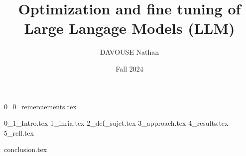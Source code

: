 \documentclass{rUTT}
\date{Fall 2024}
\author{{\sc DAVOUSE} Nathan}
\title{Optimization and fine tuning of Large Langage Models (LLM)}
\begin{document}
    \frontpageSTB %

    {
        \myILB
    }
    
    \pagestyle{UTT} 
    \justifying 


    {0_0_remerciements.tex} %

    \clearpage

    {
        \setcounter{tocdepth}{1}
        \renewcommand{\contentsname}{Summary}
        \tableofcontents
    }
    
    \clearpage
    
    {
    }
    \clearpage
    
    {
        
        \printglossary
        \printacronyms
    }
    \clearpage

    
    

    {0_1_Intro.tex}
    \clearpage
    {1_inria.tex}
    {2_def_sujet.tex}
    {3_approach.tex}
    {4_results.tex}
    {5_refl.tex}
    \clearpage
    
    {conclusion.tex}
    \label{LastPage}
    \clearpage
\end{document}
